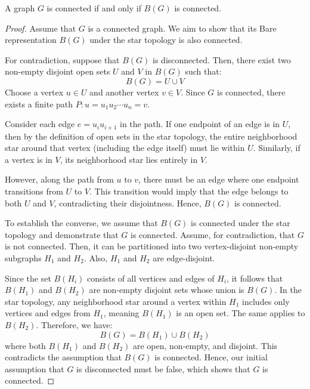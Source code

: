 \documentclass[10pt,a4paper]{amsart}
\begin{document}
	\begin{theorem}
		A graph \(G\) is connected if and only if \(B(G)\) is connected.
	\end{theorem}

	\begin{proof}
		Assume that \( G \) is a connected graph. We aim to show that its Bare representation
		\(
		B(G) \) under
		the star topology is also connected.
		
		For contradiction, suppose that \( B(G) \) is disconnected. Then, there exist two
		non-empty disjoint
		open sets \( U \) and \( V \) in \( B(G) \) such that:
		\[
		B(G) = U \cup V
		\]
		Choose a vertex \( u \in U \) and another vertex \( v \in V \). Since \( G \) is
		connected, there
		exists a finite path \( P: u = u_1u_2 \cdots u_n = v \).
		
		Consider each edge \( e = u_iu_{i+1} \) in the path. If one endpoint of an edge
		is
		in \( U \), then
		by the definition of open sets in the star topology, the entire neighborhood star
		around that vertex
		(including the edge itself) must lie within \( U \). Similarly, if a vertex is in
		\(
		V \), its
		neighborhood star lies entirely in \( V \).
		
		However, along the path from \( u \) to \( v \), there must be an edge where one
		endpoint
		transitions from \( U \) to \( V \). This transition would imply that the edge
		belongs to both \( U
		\) and \( V \), contradicting their disjointness. Hence, \( B(G) \) is connected.
		
		To establish the converse, we assume that \( B(G) \) is connected under the star
		topology and demonstrate that \( G \) is connected. Assume, for contradiction, that \( G \) is not connected. Then, it can be partitioned into two vertex-disjoint non-empty
		subgraphs \( H_1 \) and \( H_2 \). Also, \( H_1 \) and \( H_2 \) are edge-disjoint.
		
		Since the set \( B(H_i) \) consists of all vertices and edges of \( H_i \), it follows that \( B(H_1) \) and \( B(H_2) \) are non-empty disjoint sets whose union is $B(G)$. In the star topology, any neighborhood star around a vertex	within \( H_1 \) includes only vertices and edges from \( H_1 \), meaning \( B(H_1) \) is an open set. The same applies to \( B(H_2) \). Therefore, we have:
		\[
		B(G) = B(H_1) \cup B(H_2)
		\]
		where both \( B(H_1) \) and \( B(H_2) \) are open, non-empty, and disjoint. This contradicts the assumption that \( B(G) \) is connected. Hence, our initial assumption that \( G \) is disconnected must be false, which shows that \( G \) is connected.
	\end{proof}
\end{document}
